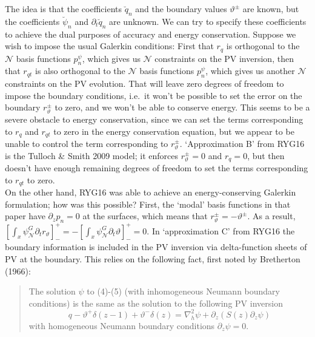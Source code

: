 \documentclass[10pt]{article}
\newcommand{\pd}[1]{\partial_{#1}}
\newcommand{\sN}{\mathcal{N}}
\begin{document}
The idea is that the coefficients $\breve q_n$ and the boundary values $\vartheta^\pm$ are known, but the coefficients $\breve \psi_n$ and $\pd{t}\breve q_n$ are unknown.
We can try to specify these coefficients to achieve the dual purposes of accuracy and energy conservation.
Suppose we wish to impose the usual Galerkin conditions:
First that $r_q$ is orthogonal to the $\sN$ basis functions $p_n^\psi$, which gives us $\sN$ constraints on the PV inversion, then that $r_{qt}$ is also orthogonal to the $\sN$ basis functions $p_n^\psi$, which gives us another $\sN$ constraints on the PV evolution.
That will leave zero degrees of freedom to impose the boundary conditions, i.e.~it won't be possible to set the error on the boundary $r_\vartheta^\pm$ to zero, and we won't be able to conserve energy.
This seems to be a severe obstacle to energy conservation, since we can set the terms corresponding to $r_q$ and $r_{qt}$ to zero in the energy conservation equation, but we appear to be unable to control the term corresponding to $r_\vartheta^\pm$.
`Approximation B' from RYG16 is the Tulloch \& Smith 2009 model; it enforces $r_\vartheta^\pm=0$ and $r_q=0$, but then doesn't have enough remaining degrees of freedom to set the terms corresponding to $r_{qt}$ to zero.\\

On the other hand, RYG16 was able to achieve an energy-conserving Galerkin formulation; how was this possible?
First, the `modal' basis functions in that paper have $\pd{z}p_n=0$ at the surfaces, which means that $r_{\vartheta}^\pm = -\vartheta^\pm$.
As a result, $[\int_x\psi_\sN^G\pd{t}r_\vartheta]_-^+ = -[\int_x\psi_\sN^G\pd{t}\vartheta]_-^+=0$. %
In `approximation C' from RYG16 the boundary information is included in the PV inversion via delta-function sheets of PV at the boundary.
This relies on the following fact, first noted by Bretherton (1966):
\begin{quote}
The solution $\psi$ to (4)-(5) (with inhomogeneous Neumann boundary conditions) is the same as the solution to the following PV inversion
\begin{equation}
q -\vartheta^+\delta(z-1) + \vartheta^-\delta(z) = \nabla_h^2\psi + \pd{z}\left(S(z)\pd{z}\psi\right)
\end{equation}
with homogeneous Neumann boundary conditions $\pd{z}\psi=0$.
\end{quote}
\end{document}
